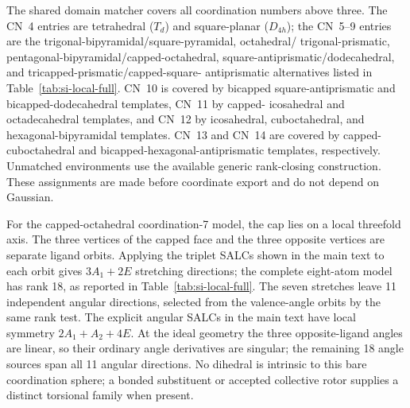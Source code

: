 \documentclass[10pt]{article}
\begin{document}
{The shared domain matcher covers all coordination numbers above three.  The
CN~4 entries are tetrahedral ($T_d$) and square-planar ($D_{4h}$); the
CN~5--9 entries are the trigonal-bipyramidal/square-pyramidal, octahedral/
trigonal-prismatic, pentagonal-bipyramidal/capped-octahedral,
square-antiprismatic/dodecahedral, and tricapped-prismatic/capped-square-
antiprismatic alternatives listed in Table~\ref{tab:si-local-full}.  CN~10 is covered by bicapped
square-antiprismatic and bicapped-dodecahedral templates, CN~11 by capped-
icosahedral and octadecahedral templates, and CN~12 by icosahedral,
cuboctahedral, and hexagonal-bipyramidal templates.  CN~13 and CN~14 are
covered by capped-cuboctahedral and bicapped-hexagonal-antiprismatic templates,
respectively.  Unmatched environments
use the available generic rank-closing construction.  These assignments are
made before coordinate export and do not depend on Gaussian.

{For the capped-octahedral coordination-7 model, the cap lies on a local
threefold axis. The three vertices of the capped face and the three opposite
vertices are separate ligand orbits. Applying the triplet SALCs shown in the
main text to each orbit gives
\(3A_1+2E\) stretching directions; the complete eight-atom model has rank
18, as reported in Table~\ref{tab:si-local-full}. The seven stretches leave
11 independent angular directions, selected from the valence-angle orbits
by the same rank test. The explicit angular SALCs in the main text have
local symmetry \(2A_1+A_2+4E\). At the ideal geometry the three
opposite-ligand angles are linear, so their ordinary angle derivatives are
singular; the remaining 18 angle sources span all 11 angular directions.
No dihedral is intrinsic to this bare coordination sphere; a bonded
substituent or accepted collective rotor supplies a distinct torsional
family when present.}

}
\end{document}
